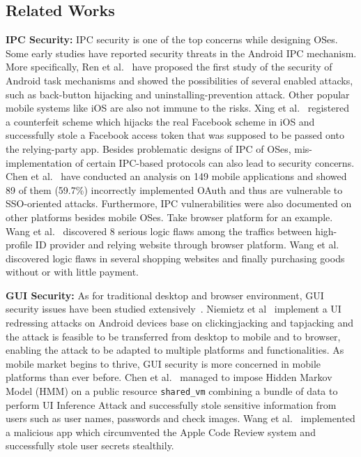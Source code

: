 \documentclass[letterpaper,12pt]{article}
\begin{document}
\subsection{Related Works}\label{sec:atmrelated}
\textbf{IPC Security:} IPC security is one of the top concerns while
designing OSes. Some early studies have reported security threats in
the Android IPC mechanism. More specifically, Ren
et al.~\cite{TaskHijacking} have proposed the first study of the
security of Android task mechanisms and showed the possibilities of
several enabled attacks, such as back-button hijacking and
uninstalling-prevention attack. Other popular mobile systems like iOS
are also not immune to the risks. Xing et al.~\cite{CrackingiOS}
registered a counterfeit scheme which hijacks the real Facebook scheme
in iOS and successfully stole a Facebook access token that was
supposed to be passed onto the relying-party app. Besides problematic
designs of IPC of OSes, mis-implementation of certain IPC-based
protocols can also lead to security concerns. Chen
et al.~\cite{OAuthDemystified} have conducted an analysis on 149
mobile applications and showed 89 of them (59.7\%) incorrectly
implemented OAuth and thus are vulnerable to SSO-oriented attacks.
Furthermore, IPC vulnerabilities were also documented on other
platforms besides mobile OSes. Take browser platform for an example.
Wang et al.~\cite{webssoattack} discovered 8 serious logic flaws among
the traffics between high-profile ID provider and relying website
through browser platform. Wang et al.~\cite{shopforfree} discovered
logic flaws in several shopping websites and finally purchasing goods
without or with little payment.

\textbf{GUI Security:} As for traditional desktop and browser
environment, GUI security issues have been studied
extensively~\cite{nitpickers,secuserinterface}. Niemietz
et al~\cite{uiredress} implement a UI redressing attacks on Android
devices base on clickingjacking and tapjacking and the attack is
feasible to be transferred from desktop to mobile and to browser,
enabling the attack to be adapted to multiple platforms and
functionalities. As mobile market begins to thrive, GUI security is
more concerned in mobile platforms than ever before. Chen
et al.~\cite{UIstateinference} managed to impose Hidden Markov Model
(HMM) on a public resource \texttt{shared\_vm} combining a bundle of
data to perform UI Inference Attack and successfully stole sensitive
information from users such as user names, passwords and check images.
Wang et al.~\cite{jekyll} implemented a malicious app which
circumvented the Apple Code Review system and successfully stole user
secrets stealthily. 
\end{document}
